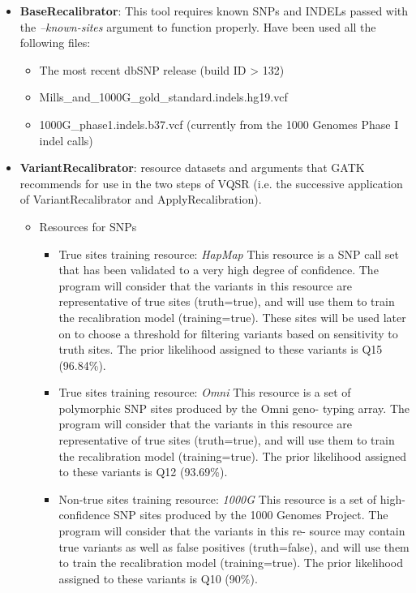 \begin{itemize}
	\item \textbf{BaseRecalibrator}: This tool requires known SNPs and INDELs passed with the \textit{--known-sites} argument to function properly. Have been used all the following files:
    \begin{itemize}
	    \item The most recent dbSNP release (build ID > 132)
	    \item Mills\_and\_1000G\_gold\_standard.indels.hg19.vcf
        \item 1000G\_phase1.indels.b37.vcf (currently from the 1000 Genomes Phase I indel calls)
    \end{itemize}
    
    \item \textbf{VariantRecalibrator}: resource datasets and arguments that GATK recommends for use in the two steps of VQSR (i.e. the successive application of VariantRecalibrator and ApplyRecalibration). 
    \begin{itemize}
    	\item Resources for SNPs
        \begin{itemize}
        	\item True sites training resource: \textit{HapMap} \newline
This resource is a SNP call set that has been validated to a very high degree of confidence. The program will consider that the variants in this resource are representative of true sites (truth=true), and will use them to train the recalibration model (training=true). These sites will be used later on to choose a threshold for filtering variants based on sensitivity to truth sites. The prior likelihood assigned to these variants is Q15 (96.84\%).
			\item True sites training resource: \textit{Omni} \newline
This resource is a set of polymorphic SNP sites produced by the Omni geno- typing array. The program will consider that the variants in this resource are representative of true sites (truth=true), and will use them to train the recalibration model (training=true). The prior likelihood assigned to these variants is Q12 (93.69\%).
			\item Non-true sites training resource: \textit{1000G} \newline
This resource is a set of high-confidence SNP sites produced by the 1000 Genomes Project. The program will consider that the variants in this re- source may contain true variants as well as false positives (truth=false), and will use them to train the recalibration model (training=true). The prior likelihood assigned to these variants is Q10 (90\%).

\end{itemize}
\end{itemize}
\end{itemize}
